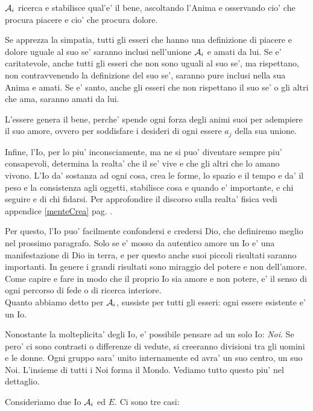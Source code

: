     $\mathcal{A}_i$ ricerca e stabilisce qual'e' il bene, ascoltando l'Anima e osservando cio' che procura piacere e cio' che procura dolore. 

    Se apprezza la simpatia, tutti gli esseri che hanno una definizione di piacere e dolore uguale al suo se' saranno inclusi nell'unione $\mathcal{A}_i$ e amati da lui. Se e' caritatevole, anche tutti gli esseri che non sono uguali al suo se', ma rispettano, non contravvenendo la definizione del suo se', saranno pure inclusi nella sua Anima e amati. Se e' santo, anche gli esseri che non rispettano il suo se' o gli altri che ama, saranno amati da lui.

    L'essere genera il bene, perche' spende ogni forza degli animi suoi per adempiere il suo amore, ovvero per soddisfare i desideri di ogni essere $a_j$ della sua unione.

    Infine, l'Io, per lo piu' inconsciamente, ma ne si puo' diventare sempre piu' consapevoli, determina la realta' che il se' vive e che gli altri che lo amano vivono. L'Io da' sostanza ad ogni cosa, crea le forme, lo spazio e il tempo e da' il peso e la consistenza agli oggetti, stabilisce cosa e quando e' importante, e chi seguire e di chi fidarsi. Per approfondire il discorso sulla realta' fisica vedi appendice \ref{menteCrea} pag. \pageref{menteCrea}.

    Per questo, l'Io puo' facilmente confondersi e credersi Dio, che definiremo meglio nel prossimo paragrafo. Solo se e' mosso da autentico amore un Io e' una manifestazione di Dio in terra, e per questo anche suoi piccoli risultati saranno importanti. In genere i grandi risultati sono miraggio del potere e non dell'amore. Come capire e fare in modo che il proprio Io sia amore e non potere, e' il senso di ogni percorso di fede o di ricerca interiore. \\

    Quanto abbiamo detto per $\mathcal{A}_i$, sussiste per tutti gli esseri: ogni essere esistente e' un Io.

    Nonostante la molteplicita' degli Io, e' possibile pensare ad un solo Io: \emph{Noi}. Se pero' ci sono contrasti o differenze di vedute, si creeranno divisioni tra gli uomini e le donne. Ogni gruppo sara' unito internamente ed avra' un suo centro, un suo Noi. L'insieme di tutti i Noi forma il Mondo. Vediamo tutto questo piu' nel dettaglio.

    Consideriamo due Io $\mathcal{A}_i$ ed $E$. Ci sono tre casi:

